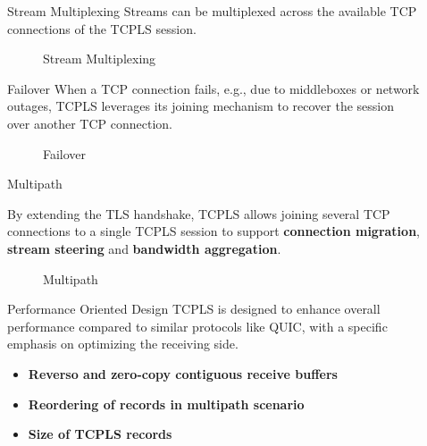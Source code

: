 \documentclass[final]{beamer}
\newlength{\sepwidth}
\newlength{\colwidth}
\newcommand{\separatorcolumn}{\begin{column}{\sepwidth}\end{column}}
\begin{document}
\begin{frame}[t]
\begin{columns}[t]
\begin{column}{\colwidth}
      \end{column}

      \separatorcolumn

      \begin{column}{\colwidth}

        \begin{block}{Stream Multiplexing}
          Streams can be multiplexed across the available TCP connections of the TCPLS session.
          \begin{figure}
            \centering
            
            \caption{Stream Multiplexing}
            \label{fig:stream-multiplex}
          \end{figure}
        \end{block}



        \begin{block}{Failover}
          When a TCP connection fails, e.g., due to middleboxes
          or network outages, TCPLS leverages its joining mechanism to recover the session over another TCP connection.
           \begin{figure}
            \centering
            
            \caption{Failover}
            \label{fig:failover}
          \end{figure}

        \end{block}

        \begin{block}{Multipath}

          By extending the TLS handshake, TCPLS allows joining several TCP connections to a
          single TCPLS session to support \textbf{connection migration},
          \textbf{stream steering} and \textbf{bandwidth aggregation}.
        \begin{figure}
          \centering
          
          \caption{Multipath}
          \label{fig:multipath}
        \end{figure}


        \end{block}
        \begin{block}{Performance Oriented Design}
          TCPLS is designed to enhance overall performance compared to similar protocols like QUIC,
          with a specific emphasis on optimizing the receiving side.
          \begin{itemize}
             \item \textbf{Reverso and zero-copy contiguous receive buffers}
            \item \textbf{Reordering of records in multipath scenario}
            \item \textbf{Size of TCPLS records}
          \end{itemize}


\end{block}
\end{column}
\end{columns}
\end{frame}
\end{document}
